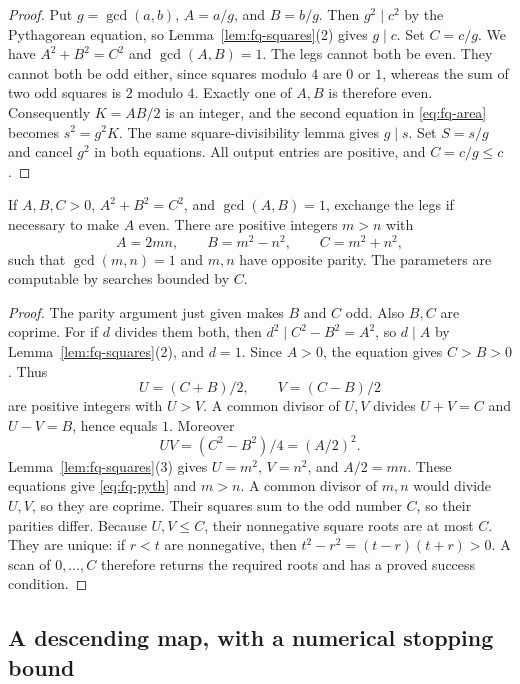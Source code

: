 \begin{proof}
Put $g=\gcd(a,b)$, $A=a/g$, and $B=b/g$.  Then
$g^2\mid c^2$ by the Pythagorean equation, so
Lemma~\ref{lem:fq-squares}(2) gives $g\mid c$.  Set $C=c/g$.
We have $A^2+B^2=C^2$ and $\gcd(A,B)=1$.
The legs cannot both be even.  They cannot both be odd either, since
squares modulo $4$ are $0$ or $1$, whereas the sum of two odd squares
is $2$ modulo $4$.  Exactly one of $A,B$ is therefore even.
Consequently $K=AB/2$ is an integer, and the second equation in
\eqref{eq:fq-area} becomes $s^2=g^2K$.  The same square-divisibility
lemma gives $g\mid s$.  Set $S=s/g$ and cancel $g^2$ in both equations.
All output entries are positive, and $C=c/g\leq c$.
\end{proof}

\begin{lemma}\label{lem:fq-pyth}
If $A,B,C>0$, $A^2+B^2=C^2$, and $\gcd(A,B)=1$, exchange the legs
if necessary to make $A$ even.  There are positive integers $m>n$ with
\[
 A=2mn,\qquad B=m^2-n^2,\qquad C=m^2+n^2,
 \tag{F3}\label{eq:fq-pyth}
\]
such that $\gcd(m,n)=1$ and $m,n$ have opposite parity.
The parameters are computable by searches bounded by $C$.
\end{lemma}

\begin{proof}
The parity argument just given makes $B$ and $C$ odd.
Also $B,C$ are coprime.  For if $d$ divides them both, then
$d^2\mid C^2-B^2=A^2$, so $d\mid A$ by
Lemma~\ref{lem:fq-squares}(2), and $d=1$.
Since $A>0$, the equation gives $C>B>0$.  Thus
\[
 U=(C+B)/2,\qquad V=(C-B)/2
\]
are positive integers with $U>V$.  A common divisor of $U,V$
divides $U+V=C$ and $U-V=B$, hence equals $1$.  Moreover
\[
 UV=(C^2-B^2)/4=(A/2)^2.
\]
Lemma~\ref{lem:fq-squares}(3) gives $U=m^2$, $V=n^2$, and
$A/2=mn$.  These equations give \eqref{eq:fq-pyth} and $m>n$.
A common divisor of $m,n$ would divide $U,V$, so they are coprime.
Their squares sum to the odd number $C$, so their parities differ.
Because $U,V\leq C$, their nonnegative square roots are at most $C$.
They are unique: if $r<t$ are nonnegative, then
$t^2-r^2=(t-r)(t+r)>0$.  A scan of $0,\ldots,C$ therefore returns
the required roots and has a proved success condition.
\end{proof}

\subsection{A descending map, with a numerical stopping bound}

